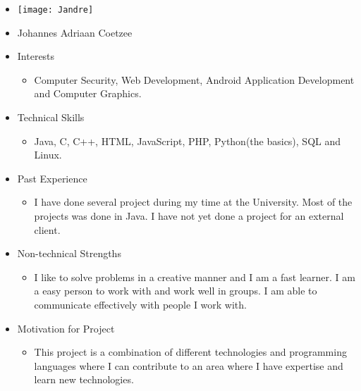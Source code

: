 
\begin{itemize}
	\item[] \texttt{[image: Jandre]}
	\item[] Johannes Adriaan Coetzee
	\item Interests
	\begin{itemize}
		\item[] Computer Security, Web Development, Android Application Development and Computer Graphics.
	\end{itemize}
	\item Technical Skills
	\begin{itemize}
		\item[] Java, C, C++, HTML, JavaScript, PHP, Python(the basics), SQL and Linux.
	\end{itemize}
	\item Past Experience
	\begin{itemize}
		\item[] I have done several project during my time at the University. Most of the projects was done in Java. I have not yet done a project for an external client.
	\end{itemize}
	\item Non-technical Strengths
	\begin{itemize}
		\item[] I like to solve problems in a creative manner and I am a fast learner. I am a easy person to work with and work well in groups. I am able to communicate effectively with people I work with.
	\end{itemize}
	\item Motivation for Project
	\begin{itemize}
		\item[] This project is a combination of different technologies and programming languages where I can contribute to an area where I have expertise and learn new technologies.
	\end{itemize}
\end{itemize}